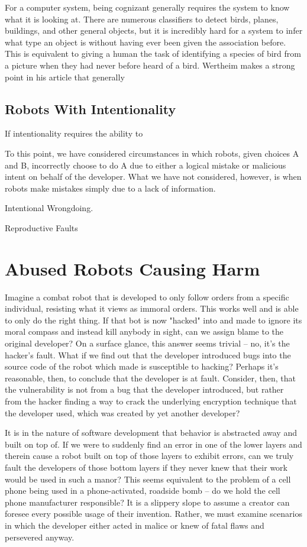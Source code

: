 \documentclass[12]{article}
\begin{document}
		For a computer system, being cognizant generally requires the system to know what it is looking at. There are numerous classifiers to detect birds, planes, buildings, and other general objects, but it is incredibly hard for a system to infer what type an object is without having ever been given the association before. This is equivalent to giving a human the task of identifying a species of bird from a picture when they had never before heard of a bird. Wertheim makes a strong point in his article that generally 

	\subsection{Robots With Intentionality}
		If intentionality requires the ability to 
	
		To this point, we have considered circumstances in which robots, given choices A and B, incorrectly choose to do A due to either a logical mistake or malicious intent on behalf of the developer. What we have not considered, however, is when robots make mistakes simply due to a lack of information.			
		
		Intentional Wrongdoing.		

		Reproductive Faults

\section{Abused Robots Causing Harm}	
	Imagine a combat robot that is developed to only follow orders from a specific individual, resisting what it views as immoral orders. This works well and is able to only do the right thing. If that bot is now "hacked" into and made to ignore its moral compass and instead kill anybody in sight, can we assign blame to the original developer? On a surface glance, this answer seems trivial -- no, it's the hacker's fault. What if we find out that the developer introduced bugs into the source code of the robot which made is susceptible to hacking? Perhaps it's reasonable, then, to conclude that the developer is at fault. Consider, then, that the vulnerability is not from a bug that the developer introduced, but rather from the hacker finding a way to crack the underlying encryption technique that the developer used, which was created by yet another developer? 
	
	It is in the nature of software development that behavior is abstracted away and built on top of. If we were to suddenly find an error in one of the lower layers and therein cause a robot built on top of those layers to exhibit errors, can we truly fault the developers of those bottom layers if they never knew that their work would be used in such a manor? This seems equivalent to the problem of a cell phone being used in a phone-activated, roadside bomb -- do we hold the cell phone manufacturer responsible? It is a slippery slope to assume a creator can foresee every possible usage of their invention. Rather, we must examine scenarios in which the developer either acted in malice or knew of fatal flaws and persevered anyway. 
\end{document}

